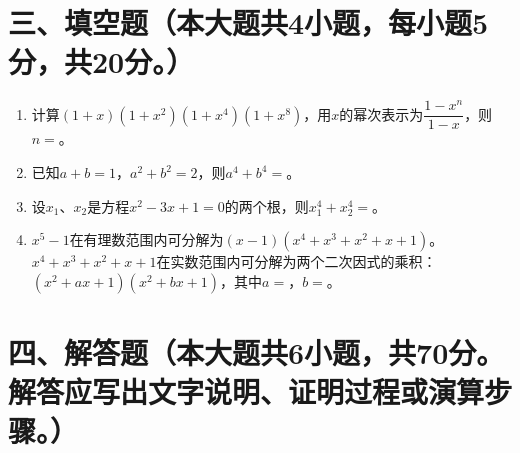 \documentclass[12pt, a4paper]{ctexart}
\begin{document}
\section*{三、填空题（本大题共4小题，每小题5分，共20分。）}

\begin{enumerate}[resume]

\item 计算$(1+x)(1+x^2)(1+x^4)(1+x^8)$，用$x$的幂次表示为$\dfrac{1-x^n}{1-x}$，则$n=$\underline{\qquad}。

\item 已知$a+b=1$，$a^2+b^2=2$，则$a^4+b^4=$\underline{\qquad}。

\item 设$x_1$、$x_2$是方程$x^2-3x+1=0$的两个根，则$x_1^4+x_2^4=$\underline{\qquad}。

\item $x^5-1$在有理数范围内可分解为$(x-1)(x^4+x^3+x^2+x+1)$。$x^4+x^3+x^2+x+1$在实数范围内可分解为两个二次因式的乘积：$(x^2+ax+1)(x^2+bx+1)$，其中$a=$\underline{\qquad}，$b=$\underline{\qquad}。

\end{enumerate}

\section*{四、解答题（本大题共6小题，共70分。解答应写出文字说明、证明过程或演算步骤。）}
\end{document}

